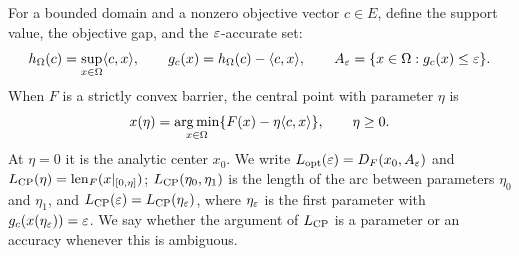 For a bounded domain and a nonzero objective vector $c\in E$, define the
support value, the objective gap, and the $\varepsilon$-accurate set:
\begin{equation}
 h_\Omega(c)=\sup_{x\in\Omega}\langle c,x\rangle,\qquad
 g_c(x)=h_\Omega(c)-\langle c,x\rangle,\qquad
 A_\varepsilon=\{x\in\Omega:g_c(x)\leq\varepsilon\}.
 \label{eq:gap-target}
\end{equation}
When $F$ is a strictly convex barrier, the central point with parameter
$\eta$ is
\begin{equation}
 x(\eta)=\operatorname*{arg\,min}_{x\in\Omega}\{F(x)-\eta\langle c,x\rangle\},\qquad \eta\geq0.
 \label{eq:central-path}
\end{equation}
At $\eta=0$ it is the analytic center $x_0$.
We write $L_{\mathrm{opt}}(\varepsilon)=D_F(x_0,A_\varepsilon)$ and
$L_{\mathrm{CP}}(\eta)=\operatorname{len}_F(x|_{[0,\eta]})$; $L_{\mathrm{CP}}(\eta_0,\eta_1)$ is the
length of the arc between parameters $\eta_0$ and $\eta_1$, and
$L_{\mathrm{CP}}(\varepsilon)=L_{\mathrm{CP}}(\eta_\varepsilon)$, where $\eta_\varepsilon$ is the first
parameter with $g_c(x(\eta_\varepsilon))=\varepsilon$. We say whether the argument
of $L_{\mathrm{CP}}$ is a parameter or an accuracy whenever this is ambiguous.
